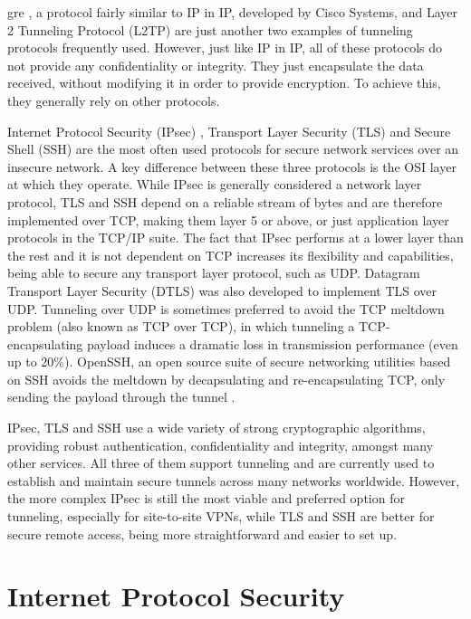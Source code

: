 \documentclass[a4paper,12pt]{report}
\begin{document}
		\acrfull{gre} \cite{rfc2784}, a protocol fairly similar to IP in IP, developed by Cisco Systems, and Layer 2 Tunneling Protocol (L2TP) \cite{rfc2661} are just another two examples of tunneling protocols frequently used. However, just like IP in IP, all of these protocols do not provide any confidentiality or integrity. They just encapsulate the data received, without modifying it in order to provide encryption. To achieve this, they generally rely on other protocols.
		
		Internet Protocol Security (IPsec) \cite{rfc6071}, Transport Layer Security (TLS) \cite{rfc8446} and Secure Shell (SSH) \cite{rfc4253} are the most often used protocols for secure network services over an insecure network. A key difference between these three protocols is the OSI layer at which they operate. While IPsec is generally considered a network layer protocol, TLS and SSH depend on a reliable stream of bytes and are therefore implemented over TCP, making them layer 5 or above, or just application layer protocols in the TCP/IP suite. The fact that IPsec performs at a lower layer than the rest and it is not dependent on TCP increases its flexibility and capabilities, being able to secure any transport layer protocol, such as UDP. Datagram Transport Layer Security (DTLS) \cite{rfc6347} was also developed to implement TLS over UDP. Tunneling over UDP is sometimes preferred to avoid the TCP meltdown problem (also known as TCP over TCP), in which tunneling a TCP-encapsulating payload induces a dramatic loss in transmission performance (even up to 20\%)\cite{tcpmeltdown}. OpenSSH, an open source suite of secure networking utilities based on SSH avoids the meltdown by decapsulating and re-encapsulating TCP, only sending the payload through the tunnel \cite{opensshmeltdown}.
		
		IPsec, TLS and SSH use a wide variety of strong cryptographic algorithms, providing robust authentication, confidentiality and integrity, amongst many other services. All three of them support tunneling and are currently used to establish and maintain secure tunnels across many networks worldwide. However, the more complex IPsec is still the most viable and preferred option for tunneling, especially for site-to-site VPNs, while TLS and SSH are better for secure remote access, being more straightforward and easier to set up.
		
	\chapter{Internet Protocol Security}
\end{document}
